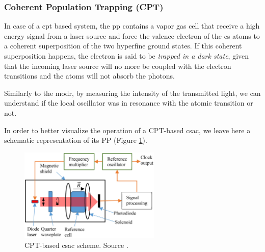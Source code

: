 \subsubsection{Coherent Population Trapping (CPT)}
\label{sssec:CPT}

In case of a \acrfull{cpt} based system, the \acrshort{pp} contains a vapor gas cell that receive a high energy signal from a laser source and force the valence electron of the \acrfull{cs} atoms to a coherent superposition of the two hyperfine ground states.
If this coherent superposition happens, the electron is said to be \textit{trapped in a dark state}, given that the incoming laser source will no more be coupled with the electron transitions and the atoms will not absorb the photons.

Similarly to the \acrshort{modr}, by measuring the intensity of the transmitted light, we can understand if the local oscillator was in resonance with the atomic transition or not.


In order to better visualize the operation of a CPT-based \acrshort{csac}, we leave here a schematic representation of its PP (Figure \ref{fig:CPT-physics-package-scheme}).

\begin{figure}[H]
    \centering
    \includegraphics[width=0.6\textwidth, max width=\linewidth]{img/CPT-phisics-package-scheme.png}
    \caption{
        CPT-based \acrshort{csac} scheme.
        Source \cite{Kitching-2018}.
    }
    \label{fig:CPT-physics-package-scheme}
\end{figure}


